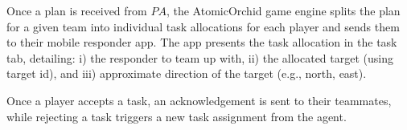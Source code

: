 Once a plan is received from $PA$, the AtomicOrchid game engine splits the plan for a given team into individual task allocations for each player and sends them to their mobile responder app. The app presents the task allocation in the task tab, detailing: i) the responder to team up with, ii) the allocated target (using target id), and iii) approximate direction of the target (e.g., north, east). 

Once a player accepts a task, an acknowledgement is sent to their teammates, while rejecting a task triggers a new task assignment from the agent. 


